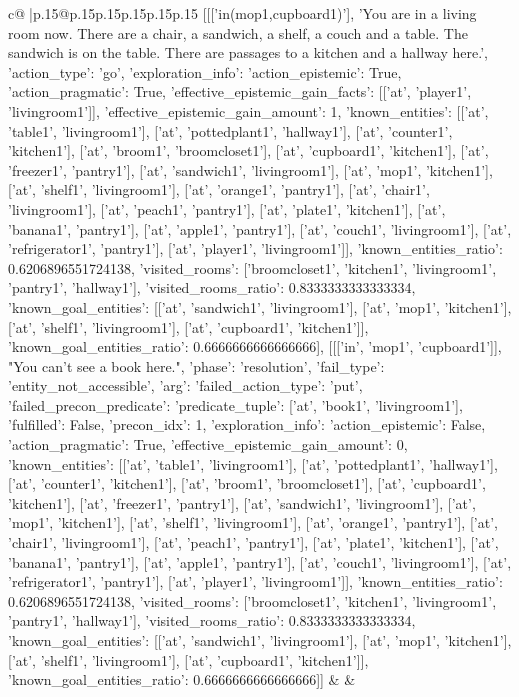 \documentclass{article}
\begin{document}
{\begin{supertabular}{c@{$\;$}|p{.15\linewidth}@{}p{.15\linewidth}p{.15\linewidth}p{.15\linewidth}p{.15\linewidth}p{.15\linewidth}}
{{{	 [[['in(mop1,cupboard1)'], 'You are in a living room now. There are a chair, a sandwich, a shelf, a couch and a table. The sandwich is on the table. There are passages to a kitchen and a hallway here.', {'action_type': 'go', 'exploration_info': {'action_epistemic': True, 'action_pragmatic': True, 'effective_epistemic_gain_facts': [['at', 'player1', 'livingroom1']], 'effective_epistemic_gain_amount': 1, 'known_entities': [['at', 'table1', 'livingroom1'], ['at', 'pottedplant1', 'hallway1'], ['at', 'counter1', 'kitchen1'], ['at', 'broom1', 'broomcloset1'], ['at', 'cupboard1', 'kitchen1'], ['at', 'freezer1', 'pantry1'], ['at', 'sandwich1', 'livingroom1'], ['at', 'mop1', 'kitchen1'], ['at', 'shelf1', 'livingroom1'], ['at', 'orange1', 'pantry1'], ['at', 'chair1', 'livingroom1'], ['at', 'peach1', 'pantry1'], ['at', 'plate1', 'kitchen1'], ['at', 'banana1', 'pantry1'], ['at', 'apple1', 'pantry1'], ['at', 'couch1', 'livingroom1'], ['at', 'refrigerator1', 'pantry1'], ['at', 'player1', 'livingroom1']], 'known_entities_ratio': 0.6206896551724138, 'visited_rooms': ['broomcloset1', 'kitchen1', 'livingroom1', 'pantry1', 'hallway1'], 'visited_rooms_ratio': 0.8333333333333334, 'known_goal_entities': [['at', 'sandwich1', 'livingroom1'], ['at', 'mop1', 'kitchen1'], ['at', 'shelf1', 'livingroom1'], ['at', 'cupboard1', 'kitchen1']], 'known_goal_entities_ratio': 0.6666666666666666}}], [[['in', 'mop1', 'cupboard1']], "You can't see a book here.", {'phase': 'resolution', 'fail_type': 'entity_not_accessible', 'arg': {'failed_action_type': 'put', 'failed_precon_predicate': {'predicate_tuple': ['at', 'book1', 'livingroom1'], 'fulfilled': False, 'precon_idx': 1}}, 'exploration_info': {'action_epistemic': False, 'action_pragmatic': True, 'effective_epistemic_gain_amount': 0, 'known_entities': [['at', 'table1', 'livingroom1'], ['at', 'pottedplant1', 'hallway1'], ['at', 'counter1', 'kitchen1'], ['at', 'broom1', 'broomcloset1'], ['at', 'cupboard1', 'kitchen1'], ['at', 'freezer1', 'pantry1'], ['at', 'sandwich1', 'livingroom1'], ['at', 'mop1', 'kitchen1'], ['at', 'shelf1', 'livingroom1'], ['at', 'orange1', 'pantry1'], ['at', 'chair1', 'livingroom1'], ['at', 'peach1', 'pantry1'], ['at', 'plate1', 'kitchen1'], ['at', 'banana1', 'pantry1'], ['at', 'apple1', 'pantry1'], ['at', 'couch1', 'livingroom1'], ['at', 'refrigerator1', 'pantry1'], ['at', 'player1', 'livingroom1']], 'known_entities_ratio': 0.6206896551724138, 'visited_rooms': ['broomcloset1', 'kitchen1', 'livingroom1', 'pantry1', 'hallway1'], 'visited_rooms_ratio': 0.8333333333333334, 'known_goal_entities': [['at', 'sandwich1', 'livingroom1'], ['at', 'mop1', 'kitchen1'], ['at', 'shelf1', 'livingroom1'], ['at', 'cupboard1', 'kitchen1']], 'known_goal_entities_ratio': 0.6666666666666666}}]] 
	  } 
	   } 
	   } 
	 & & \\ 
 


\end{supertabular}}
\end{document}
